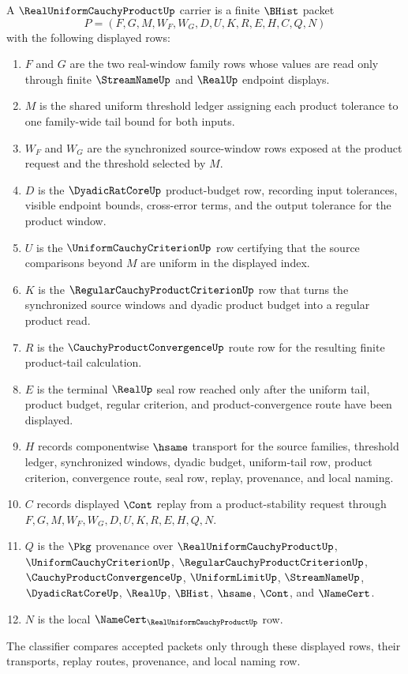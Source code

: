 \begin{definition}
\label{def:real-uniform-cauchy-product-carrier}
A $\RealUniformCauchyProductUp$ carrier is a finite $\BHist$ packet
$$
P=(F,G,M,W_F,W_G,D,U,K,R,E,H,C,Q,N)
$$
with the following displayed rows:
\begin{enumerate}
\item $F$ and $G$ are the two real-window family rows whose values are read only through finite $\StreamNameUp$ and $\RealUp$ endpoint displays.
\item $M$ is the shared uniform threshold ledger assigning each product tolerance to one family-wide tail bound for both inputs.
\item $W_F$ and $W_G$ are the synchronized source-window rows exposed at the product request and the threshold selected by $M$.
\item $D$ is the $\DyadicRatCoreUp$ product-budget row, recording input tolerances, visible endpoint bounds, cross-error terms, and the output tolerance for the product window.
\item $U$ is the $\UniformCauchyCriterionUp$ row certifying that the source comparisons beyond $M$ are uniform in the displayed index.
\item $K$ is the $\RegularCauchyProductCriterionUp$ row that turns the synchronized source windows and dyadic product budget into a regular product read.
\item $R$ is the $\CauchyProductConvergenceUp$ route row for the resulting finite product-tail calculation.
\item $E$ is the terminal $\RealUp$ seal row reached only after the uniform tail, product budget, regular criterion, and product-convergence route have been displayed.
\item $H$ records componentwise $\hsame$ transport for the source families, threshold ledger, synchronized windows, dyadic budget, uniform-tail row, product criterion, convergence route, seal row, replay, provenance, and local naming.
\item $C$ records displayed $\Cont$ replay from a product-stability request through $F,G,M,W_F,W_G,D,U,K,R,E,H,Q,N$.
\item $Q$ is the $\Pkg$ provenance over $\RealUniformCauchyProductUp$, $\UniformCauchyCriterionUp$, $\RegularCauchyProductCriterionUp$, $\CauchyProductConvergenceUp$, $\UniformLimitUp$, $\StreamNameUp$, $\DyadicRatCoreUp$, $\RealUp$, $\BHist$, $\hsame$, $\Cont$, and $\NameCert$.
\item $N$ is the local $\NameCert_{\RealUniformCauchyProductUp}$ row.
\end{enumerate}
The classifier compares accepted packets only through these displayed rows, their transports, replay routes, provenance, and local naming row.
\end{definition}

